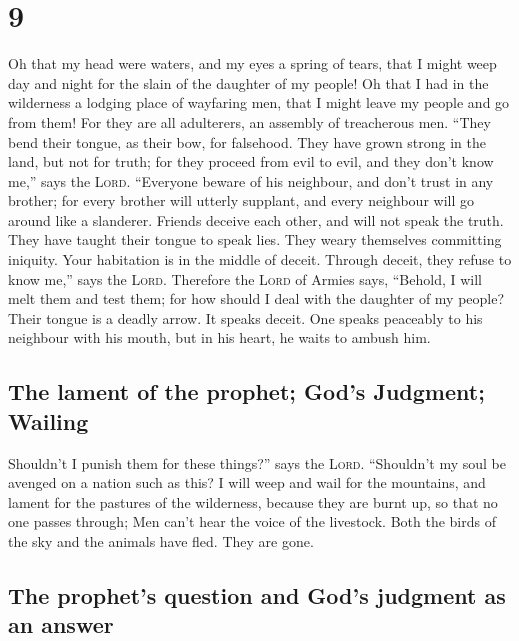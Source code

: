 \hypertarget{section-8}{%
\section{9}\label{section-8}}

 Oh that my head were waters, and my eyes a spring of
tears, that I might weep day and night for the slain of the daughter of
my people!  Oh that I had in the wilderness a lodging
place of wayfaring men, that I might leave my people and go from them!
For they are all adulterers, an assembly of treacherous men.
 ``They bend their tongue, as their bow, for falsehood.
They have grown strong in the land, but not for truth; for they proceed
from evil to evil, and they don't know me,'' says the \textsc{Lord}.
 ``Everyone beware of his neighbour, and don't trust in
any brother; for every brother will utterly supplant, and every
neighbour will go around like a slanderer.  Friends
deceive each other, and will not speak the truth. They have taught their
tongue to speak lies. They weary themselves committing iniquity.
 Your habitation is in the middle of deceit. Through
deceit, they refuse to know me,'' says the \textsc{Lord}. 
Therefore the \textsc{Lord} of Armies says, ``Behold, I will melt them
and test them; for how should I deal with the daughter of my people?
 Their tongue is a deadly arrow. It speaks deceit. One
speaks peaceably to his neighbour with his mouth, but in his heart, he
waits to ambush him.

\hypertarget{the-lament-of-the-prophet-gods-judgment-wailing}{%
\subsection{The lament of the prophet; God's Judgment;
Wailing}\label{the-lament-of-the-prophet-gods-judgment-wailing}}

 Shouldn't I punish them for these things?'' says the
\textsc{Lord}. ``Shouldn't my soul be avenged on a nation such as this?
 I will weep and wail for the mountains, and lament for
the pastures of the wilderness, because they are burnt up, so that no
one passes through; Men can't hear the voice of the livestock. Both the
birds of the sky and the animals have fled. They are gone.

\hypertarget{the-prophets-question-and-gods-judgment-as-an-answer}{%
\subsection{The prophet's question and God's judgment as an
answer}\label{the-prophets-question-and-gods-judgment-as-an-answer}}

